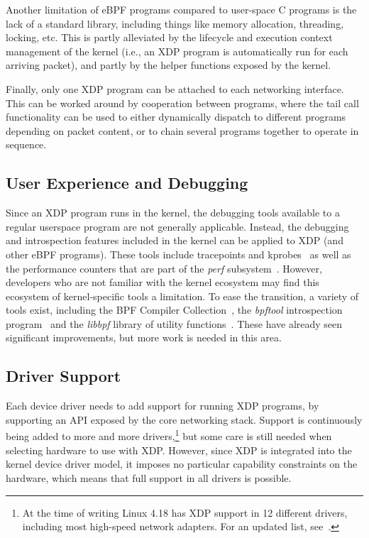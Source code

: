 \documentclass[sigconf]{acmart}
\begin{document}
Another limitation of eBPF programs compared to user-space C programs is the
lack of a standard library, including things like memory allocation, threading,
locking, etc. This is partly alleviated by the lifecycle and execution context
management of the kernel (i.e., an XDP program is automatically run for each
arriving packet), and partly by the helper functions exposed by the kernel.

Finally, only one XDP program can be attached to each networking interface. This
can be worked around by cooperation between programs, where the tail call
functionality can be used to either dynamically dispatch to different programs
depending on packet content, or to chain several programs together to operate in
sequence.

\subsection{User Experience and Debugging}
\label{sec:user-exper-debugg}
Since an XDP program runs in the kernel, the debugging tools available to a
regular userspace program are not generally applicable. Instead, the debugging
and introspection features included in the kernel can be applied to XDP (and
other eBPF programs). These tools include tracepoints and
kprobes~\cite{kernel-tracing} as well as the performance counters that are part
of the \emph{perf} subsystem~\cite{perf}. However, developers who are not
familiar with the kernel ecosystem may find this ecosystem of kernel-specific
tools a limitation. To ease the transition, a variety of tools exist, including
the BPF Compiler Collection~\cite{bcc}, the \emph{bpftool} introspection
program~\cite{bpftool} and the \emph{libbpf} library of utility
functions~\cite{libbpf}. These have already seen significant improvements, but
more work is needed in this area.


\subsection{Driver Support}
\label{sec:driver-support}
Each device driver needs to add support for running XDP programs, by supporting
an API exposed by the core networking stack. Support is continuously being added
to more and more drivers,\footnote{At the time of writing Linux 4.18 has XDP
  support in 12 different drivers, including most high-speed network adapters.
  For an updated list, see~\cite{cilium-docs}.} but some care is still needed
when selecting hardware to use with XDP. However, since XDP is integrated into
the kernel device driver model, it imposes no particular capability constraints
on the hardware, which means that full support in all drivers is possible.
\end{document}
